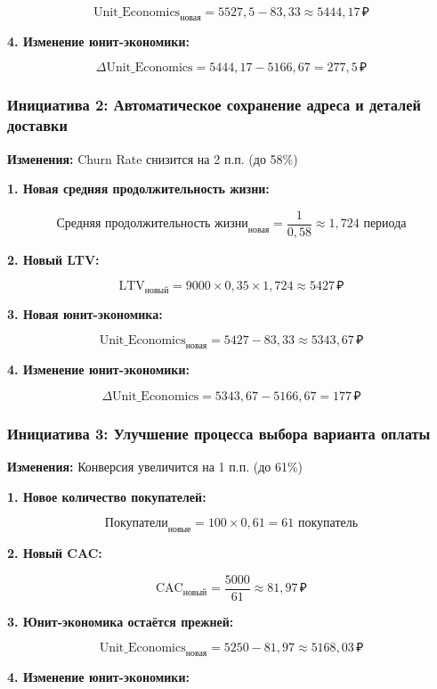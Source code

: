 \documentclass[a4paper,12pt]{article}
\begin{document}
\[
\text{Unit\_Economics}_{\text{новая}} = 5527{,}5 - 83{,}33 \approx 5444{,}17 \, \text{₽}
\]

\textbf{4. Изменение юнит-экономики:}

\[
\Delta \text{Unit\_Economics} = 5444{,}17 - 5166{,}67 = 277{,}5 \, \text{₽}
\]

\subsubsection{Инициатива 2: Автоматическое сохранение адреса и деталей доставки}

\textbf{Изменения:} Churn Rate снизится на 2 п.п. (до 58\%)

\textbf{1. Новая средняя продолжительность жизни:}

\[
\text{Средняя продолжительность жизни}_{\text{новая}} = \frac{1}{0{,}58} \approx 1{,}724 \text{ периода}
\]

\textbf{2. Новый LTV:}

\[
\text{LTV}_{\text{новый}} = 9000 \times 0{,}35 \times 1{,}724 \approx 5427 \, \text{₽}
\]

\textbf{3. Новая юнит-экономика:}

\[
\text{Unit\_Economics}_{\text{новая}} = 5427 - 83{,}33 \approx 5343{,}67 \, \text{₽}
\]

\textbf{4. Изменение юнит-экономики:}

\[
\Delta \text{Unit\_Economics} = 5343{,}67 - 5166{,}67 = 177 \, \text{₽}
\]

\subsubsection{Инициатива 3: Улучшение процесса выбора варианта оплаты}

\textbf{Изменения:} Конверсия увеличится на 1 п.п. (до 61\%)

\textbf{1. Новое количество покупателей:}

\[
\text{Покупатели}_{\text{новые}} = 100 \times 0{,}61 = 61 \text{ покупатель}
\]

\textbf{2. Новый CAC:}

\[
\text{CAC}_{\text{новый}} = \frac{5000}{61} \approx 81{,}97 \, \text{₽}
\]

\textbf{3. Юнит-экономика остаётся прежней:}

\[
\text{Unit\_Economics}_{\text{новая}} = 5250 - 81{,}97 \approx 5168{,}03 \, \text{₽}
\]

\textbf{4. Изменение юнит-экономики:}
\end{document}
